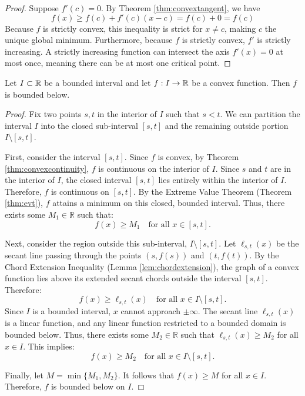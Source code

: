 \documentclass[../analysis1.tex]{subfiles}
\begin{document}
\begin{proof}
    Suppose $f'(c) = 0$. By Theorem \ref{thm:convextangent}, we have
    \[ f(x) \ge f(c) + f'(c)(x-c) = f(c) + 0 = f(c) \]
    Because $f$ is strictly convex, this inequality is strict for $x \neq c$, making $c$ the unique global minimum. 
    Furthermore, because $f$ is strictly convex, $f'$ is strictly increasing. A strictly increasing function can intersect the axis $f'(x) = 0$ at most once, meaning there can be at most one critical point.
\end{proof}



\begin{theorem}
    \begin{shaded*}
        Let $I\subset\mathbb{R}$ be a bounded interval and let $f:I\to\mathbb{R}$ be a convex function. Then $f$ is bounded below.
    \end{shaded*}
\end{theorem}

\begin{proof}
    Fix two points $s, t$ in the interior of $I$ such that $s < t$. We can partition the interval $I$ into the closed sub-interval $[s, t]$ and the remaining outside portion $I \setminus [s, t]$.

First, consider the interval $[s, t]$. Since $f$ is convex, by Theorem \ref{thm:convexcontinuity}, $f$ is continuous on the interior of $I$. Since $s$ and $t$ are in the interior of $I$, the closed interval $[s, t]$ lies entirely within the interior of $I$. Therefore, $f$ is continuous on $[s, t]$. By the Extreme Value Theorem (Theorem \ref{thm:evt}), $f$ attains a minimum on this closed, bounded interval. Thus, there exists some $M_1 \in \mathbb{R}$ such that:
\[ f(x) \ge M_1 \quad \text{for all } x \in [s, t]. \]

Next, consider the region outside this sub-interval, $I \setminus [s, t]$. Let $\ell_{s,t}(x)$ be the secant line passing through the points $(s, f(s))$ and $(t, f(t))$. By the Chord Extension Inequality (Lemma \ref{lem:chordextension}), the graph of a convex function lies above its extended secant chords outside the interval $[s,t]$. Therefore:
\[ f(x) \ge \ell_{s,t}(x) \quad \text{for all } x \in I \setminus [s, t]. \]
Since $I$ is a bounded interval, $x$ cannot approach $\pm\infty$. The secant line $\ell_{s,t}(x)$ is a linear function, and any linear function restricted to a bounded domain is bounded below. Thus, there exists some $M_2 \in \mathbb{R}$ such that $\ell_{s,t}(x) \ge M_2$ for all $x \in I$. This implies:
\[ f(x) \ge M_2 \quad \text{for all } x \in I \setminus [s, t]. \]

Finally, let $M = \min\{M_1, M_2\}$. It follows that $f(x) \ge M$ for all $x \in I$. Therefore, $f$ is bounded below on $I$.\qedhere
\end{proof}
\end{document}
